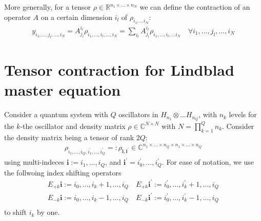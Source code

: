 \documentclass[letterpaper]{article}
\newcommand{\R}{\mathds{R}}
\newcommand{\C}{\mathds{C}}
\newcommand{\bfi}{\boldsymbol{i}}
\begin{document}
More generally, for a tensor $\rho \in \R^{n_1\times \dots \times n_N}$ we can define the contraction of an operator $A$ on a certain dimension $i_l$ of $\rho_{i_1,\dots i_N}$:
\begin{align}
    y_{i_1,\dots,j_l,\dots,i_N} = A_{j_l}^{i_l} \rho_{i_1,\dots,i_l,\dots,i_N} = \sum_{i_l} A_{j_l}^{i_l} \rho_{i_1,\dots,i_l,\dots i_N} \quad \forall i_1,\dots, j_l,\dots,i_N
\end{align}



\section{Tensor contraction for Lindblad master equation}
Consider a quantum system with $Q$ oscillators in $H_{n_1} \otimes \dots H_{n_Q}$, with $n_k$ levels for the $k$-the oscillator and density matrix $\rho \in \C^{N\times N}$ with $N=\prod_{k=1}^{Q} n_k$. Consider the density matrix being a tensor of rank $2Q$: 
\begin{align}
    \rho_{i_1,\dots, i_Q, i_1^{\prime}, \dots, i_Q^{\prime}} =: \rho_{\bfi, \bfi^\prime}\in\C^{n_1\times \dots \times n_Q \times n_1 \times \dots \times n_Q}
\end{align}
using multi-indeces $\bfi := i_{1},\dots,i_{Q}$, and $\bfi^\prime = i_0^\prime, \dots, i_Q^\prime$. For ease of notation, we use the follwoing index shifting operators 
\begin{align}
  E_{+k} \bfi := i_0,\dots, i_{k}+1, \dots, i_Q \quad E_{+k} \bfi^\prime := i_0^\prime, \dots, i_k^\prime + 1, \dots, i_Q\\
  E_{-k} \bfi := i_0,\dots, i_{k}-1, \dots, i_Q \quad E_{-k} \bfi^\prime := i_0^\prime, \dots, i_k^\prime - 1, \dots, i_Q\\
\end{align}
to shift $i_k$ by one. 
\end{document}
